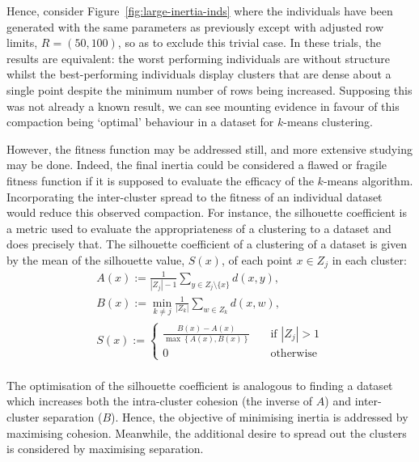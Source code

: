 \documentclass[smallextended]{svjour3}
\begin{document}
Hence, consider Figure~\ref{fig:large-inertia-inds} where the individuals have
been generated with the same parameters as previously except with adjusted row
limits, \(R = (50, 100)\), so as to exclude this trivial case. In these trials,
the results are equivalent: the worst performing individuals are without
structure whilst the best-performing individuals display clusters that are dense
about a single point despite the minimum number of rows being increased.
Supposing this was not already a known result, we can see mounting evidence in
favour of this compaction being `optimal' behaviour in a dataset for \(k\)-means
clustering.

However, the fitness function may be addressed still, and more extensive
studying may be done. Indeed, the final inertia could be considered a flawed or
fragile fitness function if it is supposed to evaluate the efficacy of the
\(k\)-means algorithm. Incorporating the inter-cluster spread to the fitness
of an individual dataset would reduce this observed compaction. For instance,
the silhouette coefficient is a metric used to evaluate the appropriateness of a
clustering to a dataset and does precisely that. The silhouette coefficient of a
clustering of a dataset is given by the mean of the silhouette value,
\(S(x)\), of each point \(x \in Z_j\) in each cluster:
\begin{equation}
    \begin{gathered}
        A(x) := \frac{1}{|Z_j| - 1} \sum_{y \in Z_j \setminus \{x\}} d(x, y),
        \\
        B(x) := \min_{k \neq j} \frac{1}{|Z_k|} \sum_{w \in Z_k} d(x, w),
        \\
        S(x) := 
            \begin{cases}
                \frac{B(x) - A(x)}{\max\left\{A(x), B(x)\right\}}
                &\quad \text{if } |Z_j| > 1\\
                0 &\quad \text{otherwise}
            \end{cases}
    \end{gathered}\label{eq:silhouette}
\end{equation}\\

The optimisation of the silhouette coefficient is analogous to finding a dataset
which increases both the intra-cluster cohesion (the inverse of \(A\)) and
inter-cluster separation (\(B\)). Hence, the objective of minimising inertia is
addressed by maximising cohesion. Meanwhile, the additional desire to spread out
the clusters is considered by maximising separation.
\end{document}
